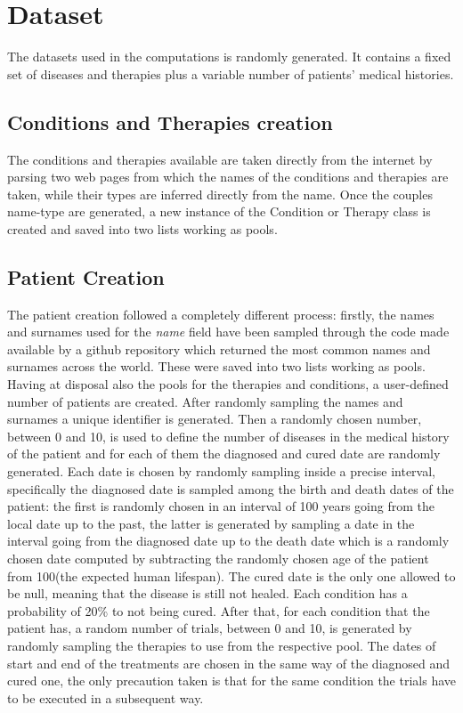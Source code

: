 \section{Dataset}
The datasets used in the computations is randomly generated.
It contains a fixed set of diseases and therapies plus a variable number of
patients' medical histories.
\subsection{Conditions and Therapies creation}
The conditions and therapies available are taken directly from the internet
by parsing two web pages\cite{ThPool}\cite{CPool} from which the names of the
conditions and therapies are taken, while their types are inferred directly
from the name. Once the couples name-type are generated, a new instance of the
Condition or Therapy class is created and saved into two lists working as pools.
\subsection{Patient Creation}
The patient creation followed a completely different process:
firstly, the names and surnames used for the \emph{name} field have been
sampled through the code made available by a
github repository\cite{NamePool} which returned the most common names and
surnames across the world. These were saved into two lists working as pools.
Having at disposal also the pools for the therapies and conditions, a
user-defined number of patients are created.
After randomly sampling the names and surnames a unique identifier is generated.
Then a randomly chosen number, between 0 and 10, is used to define the
number of diseases in the medical history of the patient and for each of
them the diagnosed and cured date are randomly generated.
Each date is chosen by randomly sampling inside a precise interval,
specifically the diagnosed date is sampled among the birth and death dates 
of the patient: the first is randomly chosen in an interval of 100 years going
from the local date up to the past, the latter is generated by sampling a date
in the interval going from the diagnosed date up to the death date which is
a randomly chosen date computed by subtracting the randomly chosen age of the
patient from 100(the expected human lifespan).
The cured date is the only one allowed to be null, meaning that the disease
is still not healed. Each condition has a probability of 20\% to not being
cured.
After that, for each condition that the patient has, a random number of trials,
between 0 and 10, is generated by randomly sampling the therapies to use from the
respective pool. The dates of start and end of the treatments are chosen in the
same way of the diagnosed and cured one, the only precaution taken is that
for the same condition the trials have to be executed in a subsequent way.

